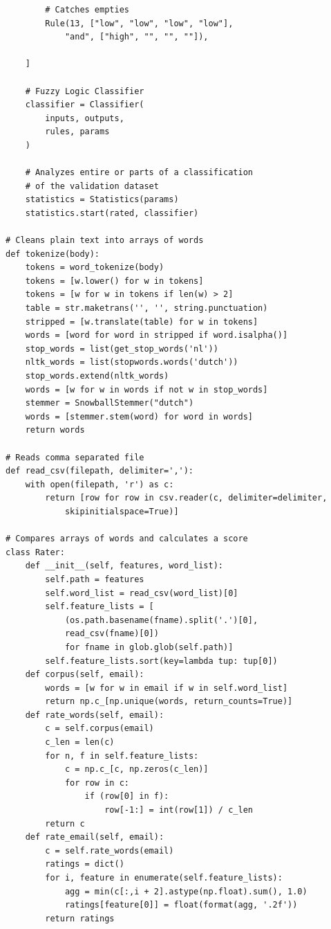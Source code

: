 \documentclass[journal]{IEEEtran}
\begin{document}
\begin{lstlisting}
		# Catches empties
		Rule(13, ["low", "low", "low", "low"],
			"and", ["high", "", "", ""]),

	]

	# Fuzzy Logic Classifier
	classifier = Classifier(
		inputs, outputs,
		rules, params
	)

	# Analyzes entire or parts of a classification
	# of the validation dataset
	statistics = Statistics(params)
	statistics.start(rated, classifier)

# Cleans plain text into arrays of words
def tokenize(body):
	tokens = word_tokenize(body)
	tokens = [w.lower() for w in tokens]
	tokens = [w for w in tokens if len(w) > 2]
	table = str.maketrans('', '', string.punctuation)
	stripped = [w.translate(table) for w in tokens]
	words = [word for word in stripped if word.isalpha()]
	stop_words = list(get_stop_words('nl'))
	nltk_words = list(stopwords.words('dutch'))
	stop_words.extend(nltk_words)
	words = [w for w in words if not w in stop_words]
	stemmer = SnowballStemmer("dutch")
	words = [stemmer.stem(word) for word in words]
	return words

# Reads comma separated file
def read_csv(filepath, delimiter=','):
	with open(filepath, 'r') as c:
		return [row for row in csv.reader(c, delimiter=delimiter,
			skipinitialspace=True)]

# Compares arrays of words and calculates a score
class Rater:
	def __init__(self, features, word_list):
		self.path = features
		self.word_list = read_csv(word_list)[0]
		self.feature_lists = [
			(os.path.basename(fname).split('.')[0],
			read_csv(fname)[0])
			for fname in glob.glob(self.path)]
		self.feature_lists.sort(key=lambda tup: tup[0])
	def corpus(self, email):
		words = [w for w in email if w in self.word_list]
		return np.c_[np.unique(words, return_counts=True)]
	def rate_words(self, email):
		c = self.corpus(email)
		c_len = len(c)
		for n, f in self.feature_lists:
			c = np.c_[c, np.zeros(c_len)]
			for row in c:
				if (row[0] in f):
					row[-1:] = int(row[1]) / c_len
		return c
	def rate_email(self, email):
		c = self.rate_words(email)
		ratings = dict()
		for i, feature in enumerate(self.feature_lists):
			agg = min(c[:,i + 2].astype(np.float).sum(), 1.0)
			ratings[feature[0]] = float(format(agg, '.2f'))
		return ratings


\end{lstlisting}
\end{document}

